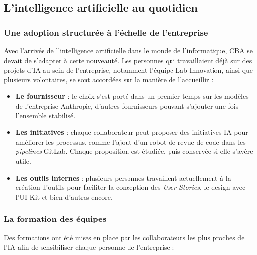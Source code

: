 \documentclass{article}
\begin{document}

\subsection{L'intelligence artificielle au quotidien}
\label{subsec:ia}

\subsubsection{Une adoption structurée à l'échelle de l'entreprise}

Avec l'arrivée de l'intelligence artificielle dans le monde de l'informatique, CBA se devait de s'adapter à cette nouveauté. Les personnes qui travaillaient déjà sur des projets d'IA au sein de l'entreprise, notamment l'équipe Lab Innovation, ainsi que plusieurs volontaires, se sont accordées sur la manière de l'accueillir :

\begin{itemize}
    \item \textbf{Le fournisseur} : le choix s'est porté dans un premier temps sur les modèles de l'entreprise Anthropic, d'autres fournisseurs pouvant s'ajouter une fois l'ensemble stabilisé.

    \item \textbf{Les initiatives} : chaque collaborateur peut proposer des initiatives IA pour améliorer les processus, comme l'ajout d'un robot de revue de code dans les \textit{pipelines} GitLab. Chaque proposition est étudiée, puis conservée si elle s'avère utile.

    \item \textbf{Les outils internes} : plusieurs personnes travaillent actuellement à la création d'outils pour faciliter la conception des \textit{User Stories}, le design avec l'UI-Kit et bien d'autres encore.
\end{itemize}

\subsubsection{La formation des équipes}

Des formations ont été mises en place par les collaborateurs les plus proches de l'IA afin de sensibiliser chaque personne de l'entreprise :
\end{document}
